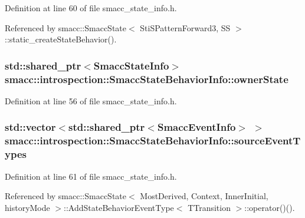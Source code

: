 Definition at line 60 of file smacc\+\_\+state\+\_\+info.\+h.



Referenced by smacc\+::\+Smacc\+State$<$ Sti\+S\+Pattern\+Forward3, S\+S $>$\+::static\+\_\+create\+State\+Behavior().

\subsubsection[{\texorpdfstring{owner\+State}{ownerState}}]{\setlength{\rightskip}{0pt plus 5cm}std\+::shared\+\_\+ptr$<${\bf Smacc\+State\+Info}$>$ smacc\+::introspection\+::\+Smacc\+State\+Behavior\+Info\+::owner\+State}\hypertarget{structsmacc_1_1introspection_1_1SmaccStateBehaviorInfo_a3a8978a085abb4e649ac4d3a13bd8257}{}\label{structsmacc_1_1introspection_1_1SmaccStateBehaviorInfo_a3a8978a085abb4e649ac4d3a13bd8257}


Definition at line 56 of file smacc\+\_\+state\+\_\+info.\+h.

\subsubsection[{\texorpdfstring{source\+Event\+Types}{sourceEventTypes}}]{\setlength{\rightskip}{0pt plus 5cm}std\+::vector$<$std\+::shared\+\_\+ptr$<${\bf Smacc\+Event\+Info}$>$ $>$ smacc\+::introspection\+::\+Smacc\+State\+Behavior\+Info\+::source\+Event\+Types}\hypertarget{structsmacc_1_1introspection_1_1SmaccStateBehaviorInfo_af4ad563a4b9ed8951ddd33732d466cf4}{}\label{structsmacc_1_1introspection_1_1SmaccStateBehaviorInfo_af4ad563a4b9ed8951ddd33732d466cf4}


Definition at line 61 of file smacc\+\_\+state\+\_\+info.\+h.



Referenced by smacc\+::\+Smacc\+State$<$ Most\+Derived, Context, Inner\+Initial, history\+Mode $>$\+::\+Add\+State\+Behavior\+Event\+Type$<$ T\+Transition $>$\+::operator()().

